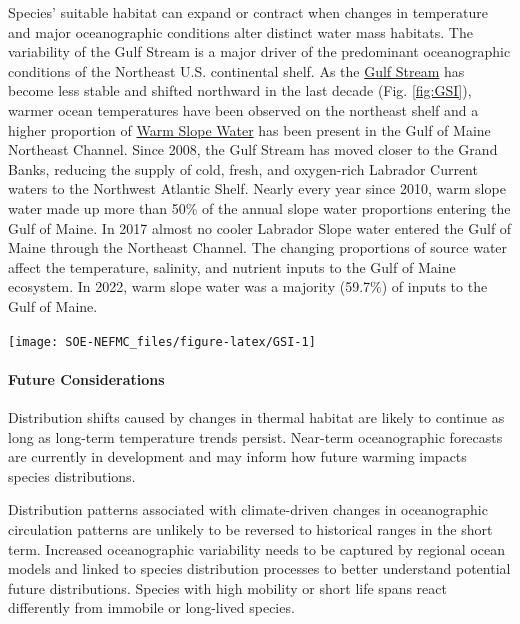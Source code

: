 \documentclass[
  10pt,
]{article}
\let\origfigure\figure
\let\endorigfigure\endfigure
\renewenvironment{figure}[1][2] {
    \expandafter\origfigure\expandafter[H]
} {
    \endorigfigure
}
\begin{document}
Species' suitable habitat can expand or contract when changes in temperature and major oceanographic conditions alter distinct water mass habitats. The variability of the Gulf Stream is a major driver of the predominant oceanographic conditions of the Northeast U.S. continental shelf. As the \href{https://noaa-edab.github.io/catalog/gulf-stream-index.html}{Gulf Stream} has become less stable and shifted northward in the last decade (Fig. \ref{fig:GSI}), warmer ocean temperatures have been observed on the northeast shelf and a higher proportion of \href{https://noaa-edab.github.io/catalog/slopewater-proportions.html}{Warm Slope Water} has been present in the Gulf of Maine Northeast Channel. Since 2008, the Gulf Stream has moved closer to the Grand Banks, reducing the supply of cold, fresh, and oxygen-rich Labrador Current waters to the Northwest Atlantic Shelf. Nearly every year since 2010, warm slope water made up more than 50\% of the annual slope water proportions entering the Gulf of Maine. In 2017 almost no cooler Labrador Slope water entered the Gulf of Maine through the Northeast Channel. The changing proportions of source water affect the temperature, salinity, and nutrient inputs to the Gulf of Maine ecosystem. In 2022, warm slope water was a majority (59.7\%) of inputs to the Gulf of Maine.

\begin{figure}

{\centering \texttt{[image: SOE-NEFMC\_files/figure-latex/GSI-1]} 

}

\caption{Index representing changes in the location of the Gulf Stream north wall. Positive values represent a more northerly Gulf Stream position.}\label{fig:GSI}
\end{figure}

\hypertarget{future-considerations}{%
\paragraph{Future Considerations}\label{future-considerations}}

Distribution shifts caused by changes in thermal habitat are likely to continue as long as long-term temperature trends persist. Near-term oceanographic forecasts are currently in development and may inform how future warming impacts species distributions.

Distribution patterns associated with climate-driven changes in oceanographic circulation patterns are unlikely to be reversed to historical ranges in the short term. Increased oceanographic variability needs to be captured by regional ocean models and linked to species distribution processes to better understand potential future distributions. Species with high mobility or short life spans react differently from immobile or long-lived species.
\end{document}

